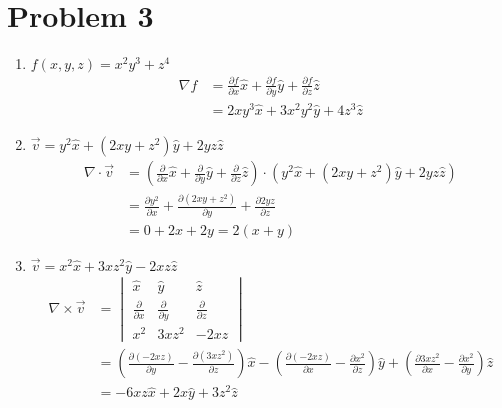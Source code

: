 \documentclass[12pt]{article}
\begin{document}
\section*{Problem 3}
\begin{enumerate}
	\item \(f(x,y,z) = x^2 y^3 +z^4\)
	      \begin{align*}
		      \nabla f & = \frac{\partial f}{\partial x} \hat{x} + \frac{\partial f}{\partial y} \hat{y} + \frac{\partial f}{\partial z} \hat{z} \\
		               & = 2xy^3 \hat{x} + 3x^2 y^2 \hat{y} + 4z^3 \hat{z}
	      \end{align*}
	\item \(\vec{v} = y^2 \hat{x} +(2xy + z^2) \hat{y} + 2yz \hat{z}\)
	      \begin{align*}
		      \nabla \cdot \vec{v} & = \left(\frac{\partial}{\partial x} \hat{x} + \frac{\partial}{\partial y}\hat{y} + \frac{\partial}{\partial z} \hat{z}\right) \cdot (y^2 \hat{x} +(2xy + z^2) \hat{y} + 2yz \hat{z}) \\
		                           & = \frac{\partial y^2}{\partial x} + \frac{\partial (2xy + z^2)}{\partial y} + \frac{\partial 2yz}{\partial z}                                                                        \\
		                           & = 0 + 2x + 2y = 2(x+y)
	      \end{align*}
	\item \(\vec{v} = x^2 \hat{x} + 3xz^2 \hat{y} - 2xz \hat{z}\)
	      \begin{align*}
		      \nabla \times \vec{v} & =
		      \begin{vmatrix}
			      \hat{x}                     & \hat{y}                     & \hat{z}                     \\
			      \frac{\partial}{\partial x} & \frac{\partial}{\partial y} & \frac{\partial}{\partial z} \\
			      x^2                         & 3xz^2                       & -2xz
		      \end{vmatrix}                                                                                                                                                                                                                     \\
		                            & = \left(\frac{\partial (-2xz)}{\partial y} - \frac{\partial (3xz^2)}{\partial z}\right)\hat{x} - \left(\frac{\partial (-2xz)}{\partial x} - \frac{\partial x^2}{\partial z} \right)\hat{y} + \left(\frac{\partial 3xz^2}{\partial x}-\frac{\partial x^2}{\partial y} \right)\hat{z} \\
		                            & = -6xz \hat{x} + 2x \hat{y} + 3z^2 \hat{z}
	      \end{align*}
\end{enumerate}
\end{document}
